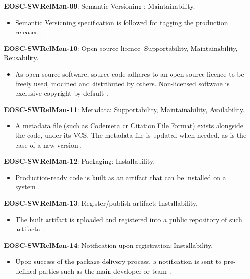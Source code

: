 \textbf{EOSC-SWRelMan-09}: Semantic Versioning : Maintainability.

\begin{itemize}
    \item Semantic Versioning specification is followed for tagging the production releases \cite{orviz_set_2017,raymond_software_2013}.
\end{itemize}

\textbf{EOSC-SWRelMan-10}: Open-source licence: Supportability, Maintainability, Reusability.

\begin{itemize}
    \item As open-source software, source code adheres to an open-source licence to be freely used, modified and distributed by others. Non-licensed software is exclusive copyright by default \cite{orviz_set_2017,raymond_software_2013}.
\end{itemize}

\textbf{EOSC-SWRelMan-11}: Metadata: Supportability, Maintainability, Availability.

\begin{itemize}
    \item A metadata file (such as Codemeta or Citation File Format) exists alongside the code, under its VCS. The metadata file is updated when needed, as is the case of a new version \cite{orviz_set_2017}.
\end{itemize}

\textbf{EOSC-SWRelMan-12}: Packaging: Installability.

\begin{itemize}
    \item Production-ready code is  built as an artifact that can be installed on a system \cite{shepherdson_cessda_2019,orviz_set_2017,raymond_software_2013}.
\end{itemize}

\textbf{EOSC-SWRelMan-13}: Register/publish artifact: Installability.

\begin{itemize}
    \item The built artifact is uploaded and registered into a public repository of such artifacts \cite{orviz_set_2017}.
\end{itemize}

\textbf{EOSC-SWRelMan-14}: Notification upon registration: Installability.

\begin{itemize}
    \item Upon success of the package delivery process, a notification is sent to pre-defined parties such as the main developer or team \cite{orviz_set_2017}.
\end{itemize}

